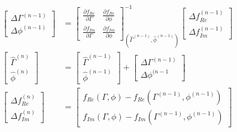 \documentclass[draftcls]{IEEEtran}
\begin{document}
\begin{align}
 \begin{bmatrix} \Delta \Gamma^{(n-1)} \\ \Delta \phi^{(n-1)} \end{bmatrix} &=
 \begin{bmatrix}
        \frac{\partial f_{Re}}{\partial \Gamma}      &  \frac{\partial f_{Re}}{\partial \phi}  \\
        \frac{\partial f_{Im}}{\partial \Gamma}      &  \frac{\partial f_{Im}}{\partial \phi}  
    \end{bmatrix} ^{-1} _{(\hat{\Gamma}^{(n-1)} ,\hat{\phi}^{(n-1)})}
    \begin{bmatrix} \Delta f_{Re}^{(n-1)} \\ \Delta f_{Im}^{(n-1)} \end{bmatrix} \\
\begin{bmatrix} \hat{\Gamma}^{(n)} \\ \hat{\phi}^{(n)} \end{bmatrix}  &= 
\begin{bmatrix} \hat{\Gamma}^{(n-1)} \\ \hat{\phi}^{(n-1)} \end{bmatrix}  + \begin{bmatrix} \Delta \Gamma^{(n-1)} \\ \Delta \phi^{(n-1} \end{bmatrix} \\
\begin{bmatrix} \Delta f_{Re}^{(n)} \\ \Delta f_{Im}^{(n)} \end{bmatrix} &= 
\begin{bmatrix} f_{Re}(\Gamma, \phi) -  f_{Re}(\Gamma^{(n-1)}, \phi^{(n-1)})\\ f_{Im}(\Gamma, \phi) -  f_{Im}(\Gamma^{(n-1)}, \phi^{(n-1)})\end{bmatrix}
\label{Eq: LQS3}
\end{align}
\end{document}
